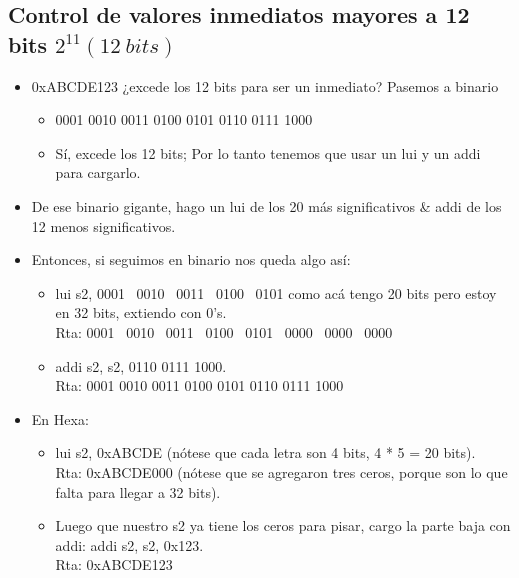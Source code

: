 \documentclass[10pt,a4paper]{article}
\begin{document}
\subsection*{Control de valores inmediatos mayores a 12 bits $2^{11} (12 \ bits)$}
\label{subsec:valores_inmediatos_32_bits}
\begin{itemize}
    \item 0xABCDE123 ¿excede los 12 bits para ser un inmediato? Pasemos a binario
    \begin{itemize}
        \item 0001 0010 0011 0100 0101 0110 0111 1000
        \item Sí, excede los 12 bits; Por lo tanto tenemos que usar un lui y un addi para cargarlo.
    \end{itemize}
    \item De ese binario gigante, hago un lui de los 20 más significativos \& addi de los 12 menos significativos.
    \item Entonces, si seguimos en binario nos queda algo así:
    \begin{itemize}
        \item lui s2, 0001 \ 0010 \ 0011 \ 0100 \ 0101 como acá tengo 20 bits pero estoy en 32 bits, extiendo con 0's. \\ Rta: 0001 \ 0010 \ 0011 \ 0100 \ 0101 \ 0000 \ 0000 \ 0000
        \item addi s2, s2, 0110 0111 1000. \\ Rta: 0001 0010 0011 0100 0101 0110 0111 1000
    \end{itemize} 
    \item En Hexa:
    \begin{itemize}
        \item lui s2, 0xABCDE (nótese que cada letra son 4 bits, 4 * 5 = 20 bits). \\ Rta: 0xABCDE000 (nótese que se agregaron tres ceros, porque son lo que falta para llegar a 32 bits).
        \item Luego que nuestro s2 ya tiene los ceros para pisar, cargo la parte baja con addi: addi s2, s2, 0x123. \\ Rta: 0xABCDE123 
    \end{itemize}
\end{itemize}
\label{subsec:}
\end{document}

